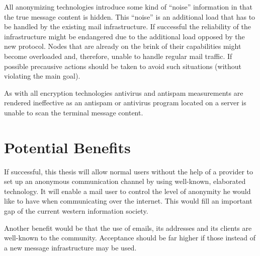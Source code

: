 \documentclass[twocolumn,a4paper,10pt,english]{scrartcl}
\begin{document}
All anonymizing technologies introduce some kind of ``noise'' information in that the true message content is hidden. This ``noise'' is an additional load that has to be handled by the existing mail infrastructure. If successful the reliability of the infrastructure might be endangered due to the additional load opposed by the new protocol. Nodes that are already on the brink of their capabilities might become overloaded and, therefore, unable to handle regular mail traffic. If possible precausive actions should be taken to avoid such situations (without violating the main goal).\par

As with all encryption technologies antivirus and antispam measurements are rendered ineffective as an antispam or antivirus program located on a server is unable to scan the terminal message content.\par

\section{Potential Benefits}
If successful, this thesis will allow normal users without the help of a provider to set up an anonymous communication channel by using well-known, elaborated technology. It will enable a mail user to control the level of anonymity he would like to have when communicating over the internet. This would fill an important gap of the current western information society. \par

Another benefit would be that the use of emails, its addresses and its clients are well-known to the community. Acceptance should be far higher if those instead of a new message infrastructure may be used.\par
\end{document}
